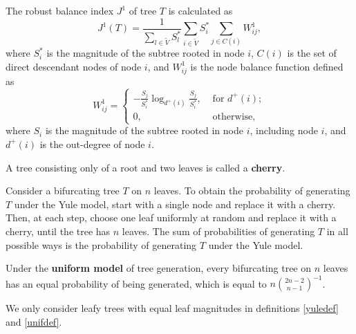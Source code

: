 \begin{definition}
            The robust balance index $J^1$ of tree $T$ is calculated as
            \begin{equation}\label{J1def}
                J^1(T) = \frac{1}{\sum_{l\in\tilde{V}}S_l^*} \sum_{i\in\tilde{V}} S_i^{*}\sum_{j\in C(i)}W_{ij}^{1},
            \end{equation}
            where $S_i^*$ is the magnitude of the subtree rooted in node $i$, $C(i)$ is the set of direct descendant nodes of node $i$, and $W_{ij}^1$ is the node balance function defined as
            \begin{equation}\label{Wij1}
                W_{ij}^1 =
                \begin{cases}
                    -\frac{S_j}{S_i^*}\log_{d^+(i)}\frac{S_j}{S_i^*},& \text{ for } d^+(i);\\
                    0, & \text{ otherwise,}
                \end{cases}
            \end{equation}
            where $S_i$ is the magnitude of the subtree rooted in node $i$, including node $i$, and $d^+(i)$ is the out-degree of node $i$.
\end{definition}
\begin{definition}[Cherry]
	A tree consisting only of a root and two leaves is called a \textbf{cherry}.
\end{definition}
\begin{definition}\label{yuledef}
    Consider a bifurcating tree $T$ on $n$ leaves. To obtain the probability of generating $T$ under the Yule model, start with a single node and replace it with a cherry. Then, at each step, choose one leaf uniformly at random and replace it with a cherry, until the tree has $n$ leaves. The sum of probabilities of generating $T$ in all possible ways is the probability of generating $T$ under the Yule model.
\end{definition}
\begin{definition}\label{unifdef}
    Under the \textbf{uniform model} of tree generation, every bifurcating tree on $n$ leaves has an equal probability of being generated, which is equal to $n\binom{2n-2}{n-1}^{-1}$.
\end{definition}
\begin{remark}
	We only consider leafy trees with equal leaf magnitudes in definitions \ref{yuledef} and \ref{unifdef}.
\end{remark}


